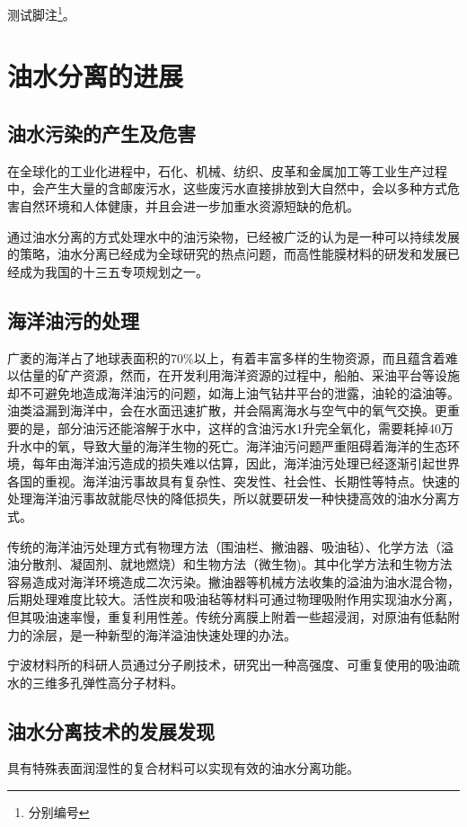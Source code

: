 测试脚注\footnote{分别编号}。

\section{油水分离的进展}

\subsection{油水污染的产生及危害}
在全球化的工业化进程中，石化、机械、纺织、皮革和金属加工等工业生产过程中，会产生大量的含邮废污水，这些废污水直接排放到大自然中，会以多种方式危害自然环境和人体健康，并且会进一步加重水资源短缺的危机。\par 
通过油水分离的方式处理水中的油污染物，已经被广泛的认为是一种可以持续发展的策略，油水分离已经成为全球研究的热点问题，而高性能膜材料的研发和发展已经成为我国的十三五专项规划之一。
\subsection{海洋油污的处理}
广袤的海洋占了地球表面积的70\%以上，有着丰富多样的生物资源，而且蕴含着难以估量的矿产资源，然而，在开发利用海洋资源的过程中，船舶、采油平台等设施却不可避免地造成海洋油污的问题，如海上油气钻井平台的泄露，油轮的溢油等。油类溢漏到海洋中，会在水面迅速扩散，并会隔离海水与空气中的氧气交换。更重要的是，部分油污还能溶解于水中，这样的含油污水1升完全氧化，需要耗掉40万升水中的氧，导致大量的海洋生物的死亡。海洋油污问题严重阻碍着海洋的生态环境，每年由海洋油污造成的损失难以估算，因此，海洋油污处理已经逐渐引起世界各国的重视。海洋油污事故具有复杂性、突发性、社会性、长期性等特点。快速的处理海洋油污事故就能尽快的降低损失，所以就要研发一种快捷高效的油水分离方式。\par
传统的海洋油污处理方式有物理方法（围油栏、撇油器、吸油毡）、化学方法（溢油分散剂、凝固剂、就地燃烧）和生物方法（微生物)。其中化学方法和生物方法容易造成对海洋环境造成二次污染。撇油器等机械方法收集的溢油为油水混合物，后期处理难度比较大。活性炭和吸油毡等材料可通过物理吸附作用实现油水分离，但其吸油速率慢，重复利用性差。传统分离膜上附着一些超浸润，对原油有低黏附力的涂层，是一种新型的海洋溢油快速处理的办法。\par 
宁波材料所的科研人员通过分子刷技术，研究出一种高强度、可重复使用的吸油疏水的三维多孔弹性高分子材料。
\subsection{油水分离技术的发展发现}
具有特殊表面润湿性的复合材料可以实现有效的油水分离功能。

